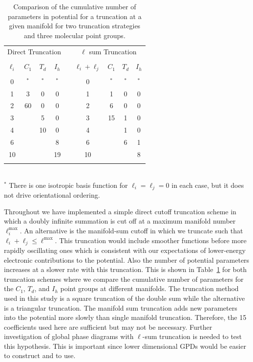 \documentclass[preprint]{iucr}              %
\begin{document}
\begin{table}
\caption{Comparison of the cumulative number of parameters in
potential for a truncation at a given manifold for two truncation
strategies and three molecular point groups.}\label{tab:truncation}
\begin{tabular}{ccccccccc}
\multicolumn{4}{c}{Direct Truncation} & &\multicolumn{4}{c}{$\ell$ sum Truncation}\\
\cline{1-4}\cline{6-9}\\
$\ell_i$ & $C_1$ & $T_d$ & $I_h$ & & $\ell_i+\ell_j$ & $C_1$ &
$T_d$ & $I_h$\\
\cline{1-4}\cline{6-9}\\
0  & $^*$  & $^*$  & $^*$  & & 0  & $^*$  & $^*$ & $^*$ \\
1  & 3  & 0  & 0  & & 1  & 1  & 0 & 0 \\
2  & 60 & 0  & 0  & & 2  & 6  & 0 & 0 \\
3  &    & 5  & 0  & & 3  & 15 & 1 & 0 \\
4  &    & 10 & 0  & & 4  &    & 1 & 0 \\
6  &    &    & 8  & & 6  &    & 6 & 1 \\
10 &    &    & 19 & & 10 &    &   & 8 \\
\cline{1-4}\cline{6-9}\\
\end{tabular}
\\$^*$ There is one isotropic basis function for $\ell_i=\ell_j=0$ in
each case, but it does not drive orientational ordering.
\end{table}

Throughout we have implemented a simple direct cutoff truncation
scheme in which a doubly infinite summation is cut off at a maximum
manifold number $\ell_i^\mathrm{max}$.  An alternative is the
manifold-sum cutoff in which we truncate such that $\ell_i+\ell_j\le
\ell^\mathrm{max}$. This truncation would include smoother functions
before more rapidly oscillating ones which is consistent with our
expectations of lower-energy electronic contributions to the
potential. Also the number of potential parameters increases at a
slower rate with this truncation. This is shown in
Table~\ref{tab:truncation} for both truncation schemes where we
compare the cumulative number of parameters for the $C_1$, $T_d$,
and $I_h$ point groups at different manifolds. The truncation method
used in this study is a square truncation of the double sum while
the alternative is a triangular truncation. The manifold sum
truncation adds new parameters into the potential more slowly than
single manifold truncation. Therefore, the 15 coefficients used here
are sufficient but may not be necessary. Further investigation of
global phase diagrams with $\ell$-sum truncation is needed to test
this hypothesis. This is important since lower dimensional GPDs
would be easier to construct and to use.
\end{document}

